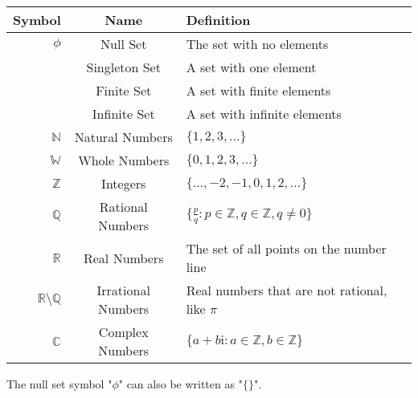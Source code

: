 \medskip
\begin{tabular}{r|c|l}
	\hline
	Symbol & Name & Definition\\
	\hline
	$\phi$ & Null Set & The set with no elements\\
	 & Singleton Set & A set with one element\\
	 & Finite Set & A set with finite elements\\
	 & Infinite Set & A set with infinite elements\\
	$\mathbb{N}$ & Natural Numbers & $\{1,2,3,\dots\}$\\
	$\mathbb{W}$ & Whole Numbers & $\{0,1,2,3,\dots\}$\\
	$\mathbb{Z}$ & Integers & $\{\dots, -2, -1, 0, 1, 2, \dots\}$\\
	$\mathbb{Q}$ & Rational Numbers &
	$\displaystyle \bigg\{ \frac{p}{q} : p \in \mathbb{Z}, q \in \mathbb{Z}, q \neq 0 \bigg\}$\\
	$\mathbb{R}$ & Real Numbers & The set of all points on the number line\\
	$\mathbb{R}\setminus\mathbb{Q}$ & Irrational Numbers & Real numbers that are not rational, like $\pi$\\
	$\mathbb{C}$ & Complex Numbers & $\{a+b\mathrm{i} : a \in \mathbb{Z}, b \in \mathbb{Z}\}$\\
	\hline
\end{tabular}
\medskip

\begin{boxnotation*}{}{}
	The null set symbol "$\phi$" can also be written as "$\{\}$".
\end{boxnotation*}

